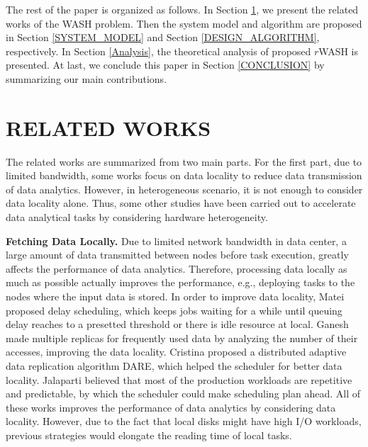 \documentclass[conference]{IEEEtran}
\begin{document}
The rest of the paper is organized as follows. In Section \ref{RELATED_WORKS}, we present the related works of the WASH problem. 
Then the system model and algorithm are proposed in Section \ref{SYSTEM_MODEL} and Section \ref{DESIGN_ALGORITHM}, respectively. 
In Section \ref{Analysis}, the theoretical analysis of proposed $r$WASH is presented.
At last, we conclude this paper in Section \ref{CONCLUSION} by summarizing our main contributions.


\section{RELATED WORKS}\label{RELATED_WORKS}
The related works are summarized from two main parts. For the first part, due to limited bandwidth, some works focus on data locality \cite{b2} \cite{b3} \cite{b4} \cite{b5} to reduce data transmission of data analytics. However, in heterogeneous scenario, it is not enough to consider data locality alone. Thus, some other studies \cite{b1} \cite{b6} \cite{b19} \cite{b8} have been carried out to accelerate data analytical tasks by considering hardware heterogeneity.

\textbf{Fetching Data Locally.} Due to limited network bandwidth in data center, a large amount of data transmitted between nodes before task execution, greatly affects the performance of data analytics. Therefore, processing data locally as much as possible actually improves the performance, e.g., deploying tasks to the nodes where the input data is stored. 
In order to improve data locality, Matei \cite{b2} proposed delay scheduling, which keeps jobs waiting for a while until queuing delay reaches to a presetted threshold or there is idle resource at local.
Ganesh \cite{b3} made multiple replicas for frequently used data by analyzing the number of their accesses, improving the data locality. 
Cristina \cite{b4} proposed a distributed adaptive data replication algorithm DARE, which helped the scheduler for better data locality. 
Jalaparti \cite{b5} believed that most of the production workloads are repetitive and predictable, by which the scheduler could make scheduling plan ahead. 
All of these works improves the performance of data analytics by considering data locality. 
However, due to the fact that local disks might have high I/O workloads, previous strategies would elongate the reading time of local tasks.
\end{document}
